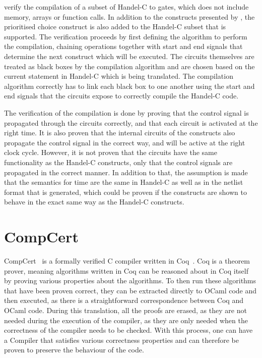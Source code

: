 \citeauthor{perna12_mechan_wire_wise_verif_handel_c_synth} verify the
compilation of a subset of Handel-C to gates, which does not include memory,
arrays or function calls.  In addition to the constructs presented by
\citeauthor{page91_compil_occam}, the prioritised choice construct is also added
to the Handel-C subset that is supported.  The verification proceeds by first
defining the algorithm to perform the compilation, chaining operations together
with start and end signals that determine the next construct which will be
executed.  The circuits themselves are treated as black boxes by the compilation
algorithm and are chosen based on the current statement in Handel-C which is
being translated.  The compilation algorithm correctly has to link each black
box to one another using the start and end signals that the circuits expose to
correctly compile the Handel-C code.

The verification of the compilation is done by proving that the control signal
is propagated through the circuits correctly, and that each circuit is activated
at the right time.  It is also proven that the internal circuits of the
constructs also propagate the control signal in the correct way, and will be
active at the right clock cycle.  However, it is not proven that the circuits
have the same functionality as the Handel-C constructs, only that the control
signals are propagated in the correct manner.  In addition to that, the
assumption is made that the semantics for time are the same in Handel-C as well
as in the netlist format that is generated, which could be proven if the
constructs are shown to behave in the exact same way as the Handel-C constructs.

\section{CompCert}%
\label{sec:bg:compcert}

\gls{CompCert}~\cite{leroy09_formal_verif_compil_back_end} is a formally
verified C compiler written in
Coq~\cite{bertot04_inter_theor_provin_progr_devel}.  Coq is a theorem prover,
meaning algorithms written in Coq can be reasoned about in Coq itself by proving
various properties about the algorithms.  To then run these algorithms that have
been proven correct, they can be extracted directly to OCaml code and then
executed, as there is a straightforward correspondence between Coq and OCaml
code.  During this translation, all the proofs are erased, as they are not
needed during the execution of the compiler, as they are only needed when the
correctness of the compiler needs to be checked.  With this process, one can
have a Compiler that satisfies various correctness properties and can therefore
be proven to preserve the behaviour of the code.

